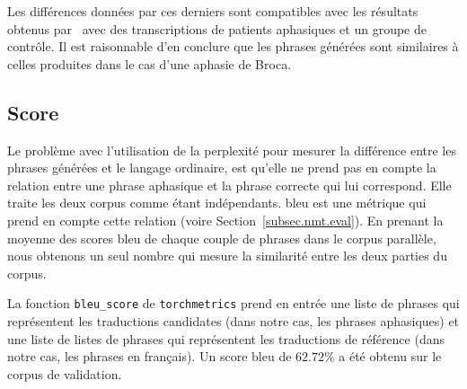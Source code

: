 Les différences données par ces derniers sont compatibles avec les résultats obtenus 
par~\cite{ghumman2021training} avec des transcriptions de patients aphasiques et un groupe de contrôle.
Il est raisonnable d'en conclure que les phrases générées sont similaires 
à celles produites dans le cas d'une aphasie de Broca.

\subsection{Score }%
\label{subsec.results.corpus.bleu}

Le problème avec l'utilisation de la perplexité pour mesurer 
la différence entre les phrases générées et le langage ordinaire,
est qu'elle ne prend pas en compte la relation entre une phrase aphasique et la phrase correcte qui lui correspond. 
Elle traite les deux corpus comme étant indépendants.
\gls{bleu} est une métrique qui prend en compte cette relation (voire Section~\ref{subsec.nmt.eval}).
En prenant la moyenne des scores \gls{bleu} de chaque couple de phrases dans le corpus parallèle,
nous obtenons un seul nombre qui mesure la similarité entre les deux parties du corpus.

La fonction \verb|bleu_score| de \verb|torchmetrics| prend en entrée 
une liste de phrases qui représentent les traductions candidates (dans notre cas, les phrases aphasiques)
et une liste de listes de phrases qui représentent les traductions de référence (dans notre cas, les phrases en français).
Un score \gls{bleu} de \(62.72\%\) a été obtenu sur le corpus de validation.
